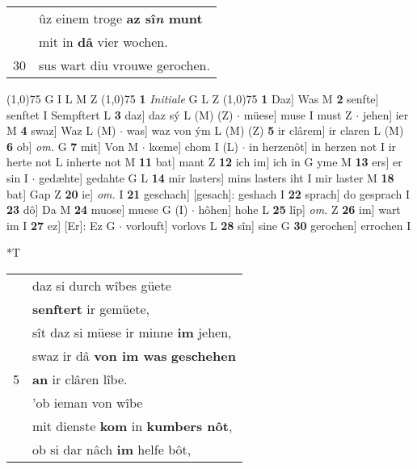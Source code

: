 \documentclass[8pt,a4paper,notitlepage]{article}
\begin{document}
\begin{table}[ht]
\begin{minipage}[t]{0.5\linewidth}
\begin{tabular}{rl}
 & ûz einem troge \textbf{az sî\textit{n} munt}\\ 
 & mit in \textbf{dâ} vier wochen.\\ 
30 & sus wart diu vrouwe gerochen.\\ 
\end{tabular}
\scriptsize
\line(1,0){75} \newline
G I L M Z \newline
\line(1,0){75} \newline
\textbf{1} \textit{Initiale} G L Z  \newline
\line(1,0){75} \newline
\textbf{1} Daz] Was M \textbf{2} senfte] senftet I Sempftert L \textbf{3} daz] daz sý L (M) (Z)  $\cdot$ müese] muse I must Z  $\cdot$ jehen] ier M \textbf{4} swaz] Waz L (M)  $\cdot$ was] waz von ým L (M) (Z) \textbf{5} ir clârem] ir claren L (M) \textbf{6} ob] \textit{om.} G \textbf{7} mit] Von M  $\cdot$ kœme] chom I (L)  $\cdot$ in herzenôt] in herzen not I ir herte not L inherte not M \textbf{11} bat] mant Z \textbf{12} ich im] ich in G yme M \textbf{13} ers] er sin I  $\cdot$ gedæhte] gedahte G L \textbf{14} mir lasters] mins lasters iht I mir laster M \textbf{18} bat] Gap Z \textbf{20} ie] \textit{om.} I \textbf{21} geschach] [gesach]: geshach I \textbf{22} sprach] do gesprach I \textbf{23} dô] Da M \textbf{24} muose] muese G (I)  $\cdot$ hôhen] hohe L \textbf{25} lîp] \textit{om.} Z \textbf{26} im] wart im I \textbf{27} ez] [Er]: Ez G  $\cdot$ vorlouft] vorlovs L \textbf{28} sîn] sine G \textbf{30} gerochen] errochen I \newline
\end{minipage}
\hspace{0.5cm}
\begin{minipage}[t]{0.5\linewidth}
\small
\begin{center}*T
\end{center}
\begin{tabular}{rl}
 & daz si durch wîbes güete\\ 
 & \textbf{senftert} ir gemüete,\\ 
 & sît daz si müese ir minne \textbf{im} jehen,\\ 
 & swaz ir dâ \textbf{von im was} \textbf{geschehen}\\ 
5 & \textbf{an} ir clâren lîbe.\\ 
 & 'ob ieman von wîbe\\ 
 & mit dienste \textbf{kom} in \textbf{kumbers nôt},\\ 
 & ob si dar nâch \textbf{im} helfe bôt,\\ 

\end{tabular}
\end{minipage}
\end{table}
\end{document}
